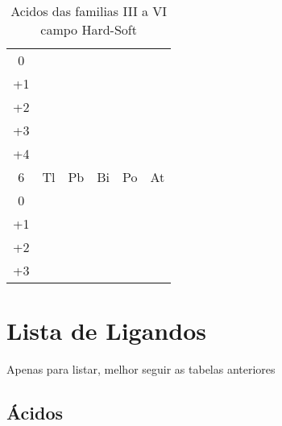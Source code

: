 \documentclass{article}
\renewcommand\arraystretch{1.25}	%
\begin{document}
{{\begin{table}[H]
{\begin{tabular}{*{6}{c}}
	0
	& \HSABemphI
	& \HSABemphH
	& \HSABemphH
	& 
	& 
	
	\\
	
	+1
	& \HSABemphH
	& \HSABemphH
	& \HSABemphH
	& \HSABemphH
	& 
	
	\\
	
	+2
	& 
	& \HSABemphI
	& 
	& 
	& 
	
	\\
	
	+3
	& \HSABemphH
	& 
	& \HSABemphI
	& 
	& 
	
	\\
	
	+4
	& \HSABemphH
	& \HSABemphH
	& 
	&
	& 
	
	
	\\ \midrule
	
	6
	& Tl
	& Pb
	& Bi
	& Po
	& At
	
	\\ \midrule
	
	0
	& \HSABemphS
	& \HSABemphI
	& \HSABemphI
	& 
	& 
		
	\\
	
	+1
	& \HSABemphS
	& \HSABemphI
	& \HSABemphI
	& 
	& 
	
	\\
	
	+2
	& \HSABemphS
	& \HSABemphIS
	& \HSABemphI
	& 
	& 
	
	\\
	
	+3
	& \HSABemphS
	& \HSABemphS
	& \HSABemphI
	& 
	& 
	
	\\ \bottomrule

\end{tabular}
}
\caption{Acidos das familias III a VI campo Hard-Soft}
\end{table}

\newpage

\section{Lista de Ligandos}
Apenas para listar, melhor seguir as tabelas anteriores

\begin{multicols}{2}

\setlength\tabcolsep{5mm}

\subsection{Ácidos}
{

}
\end{multicols}}}
\end{document}
